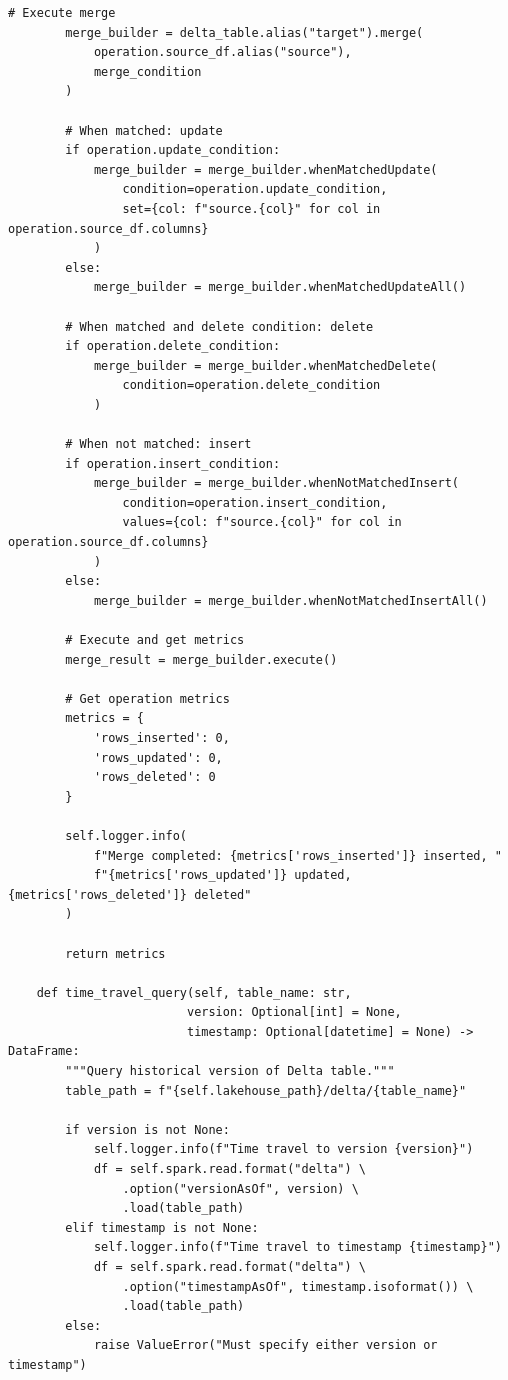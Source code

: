 \begin{lstlisting}[style=python, caption=LakehouseIntegrator with Modern Table Formats]
        # Execute merge
        merge_builder = delta_table.alias("target").merge(
            operation.source_df.alias("source"),
            merge_condition
        )

        # When matched: update
        if operation.update_condition:
            merge_builder = merge_builder.whenMatchedUpdate(
                condition=operation.update_condition,
                set={col: f"source.{col}" for col in operation.source_df.columns}
            )
        else:
            merge_builder = merge_builder.whenMatchedUpdateAll()

        # When matched and delete condition: delete
        if operation.delete_condition:
            merge_builder = merge_builder.whenMatchedDelete(
                condition=operation.delete_condition
            )

        # When not matched: insert
        if operation.insert_condition:
            merge_builder = merge_builder.whenNotMatchedInsert(
                condition=operation.insert_condition,
                values={col: f"source.{col}" for col in operation.source_df.columns}
            )
        else:
            merge_builder = merge_builder.whenNotMatchedInsertAll()

        # Execute and get metrics
        merge_result = merge_builder.execute()

        # Get operation metrics
        metrics = {
            'rows_inserted': 0,
            'rows_updated': 0,
            'rows_deleted': 0
        }

        self.logger.info(
            f"Merge completed: {metrics['rows_inserted']} inserted, "
            f"{metrics['rows_updated']} updated, {metrics['rows_deleted']} deleted"
        )

        return metrics

    def time_travel_query(self, table_name: str,
                         version: Optional[int] = None,
                         timestamp: Optional[datetime] = None) -> DataFrame:
        """Query historical version of Delta table."""
        table_path = f"{self.lakehouse_path}/delta/{table_name}"

        if version is not None:
            self.logger.info(f"Time travel to version {version}")
            df = self.spark.read.format("delta") \
                .option("versionAsOf", version) \
                .load(table_path)
        elif timestamp is not None:
            self.logger.info(f"Time travel to timestamp {timestamp}")
            df = self.spark.read.format("delta") \
                .option("timestampAsOf", timestamp.isoformat()) \
                .load(table_path)
        else:
            raise ValueError("Must specify either version or timestamp")


\end{lstlisting}
